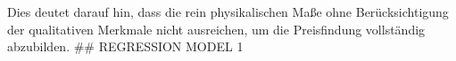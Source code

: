 Dies deutet darauf hin, dass die rein physikalischen Maße ohne Berücksichtigung der qualitativen Merkmale nicht ausreichen, um die Preisfindung vollständig abzubilden. ## REGRESSION MODEL 1